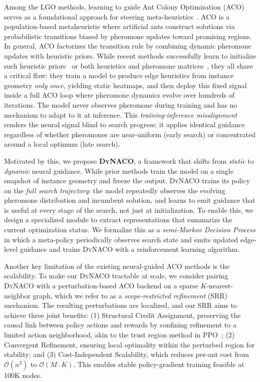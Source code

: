 \documentclass[sigconf,review]{acmart}
\newcommand{\DyNACO}{\textsc{DyNACO}}
\begin{document}
Among the LGO methods, learning to guide Ant Colony Optimization (ACO)~\cite{ACO, maxmin} serves as a foundational approach for steering meta-heuristics~\cite{deepaco,gtgaco}. ACO is a population-based metaheuristic where artificial ants construct solutions via probabilistic transitions biased by pheromone updates toward promising regions. In general, ACO factorizes the transition rule by combining dynamic pheromone updates with heuristic priors. While recent methods successfully learn to initialize such heuristic priors~\cite{deepaco,gfacs} or both heuristics and pheromone matrices~\cite{gtgaco}, they all share a critical flaw: they train a model to produce edge heuristics from instance geometry \emph{only once}, yielding static heatmaps, and then deploy this fixed signal inside a full ACO loop where pheromone dynamics evolve over hundreds of iterations.
The model never observes pheromone during training and has no mechanism to adapt to it at inference.
This \emph{training-inference misalignment} renders the neural signal blind to search progress: it applies identical guidance regardless of whether pheromones are near-uniform (early search) or concentrated around a local optimum (late search).

Motivated by this, we propose \textbf{\DyNACO{}}, a framework that shifts from \emph{static} to \emph{dynamic} neural guidance. While prior methods train the model on a single snapshot of instance geometry and freeze the output, \DyNACO{} trains its policy on the \emph{full search trajectory}: the model repeatedly observes the evolving pheromone distribution and incumbent solution, and learns to emit guidance that is useful at every stage of the search, not just at initialization. To enable this, we design a specialized module to extract representations that summarize the current optimization status. 
We formalize this as a \emph{semi-Markov Decision Process} in which a meta-policy periodically observes search state and emits updated edge-level guidance and trains \DyNACO{}  with a reinforcement learning algorithm.

Another key limitation of the existing neural-guided ACO methods is the scalability.
To make our \DyNACO{} tractable at scale, we consider pairing \DyNACO{} with a perturbation-based ACO backend on a sparse $K$-nearest-neighbor graph, which we refer to as a \emph{scope-restricted refinement} (SRR) mechanism.
The resulting perturbations are localized, and our SRR aims to achieve three joint benefits: (1) Structural Credit Assignment, preserving the causal link between policy actions and rewards by confining refinement to a limited action neighborhood, akin to the trust region method in PPO~\cite{PPO}; (2) Convergent Refinement, ensuring local optimality within the perturbed region for stability; and (3) Cost-Independent Scalability, which reduces per-ant cost from $\mathcal{O}(n^2)$ to $\mathcal{O}(M \cdot K)$. This enables stable policy-gradient training feasible at 100K nodes.
\end{document}
